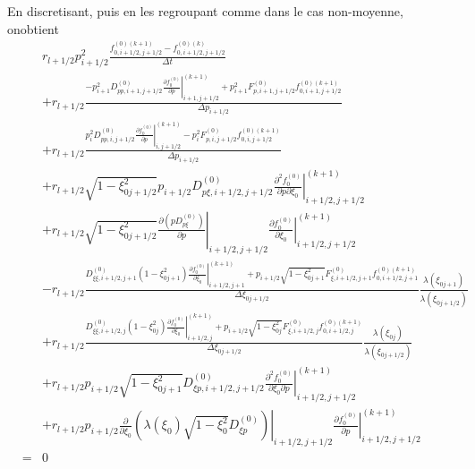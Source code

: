 En discretisant, puis en les regroupant comme dans le cas non-moyenne,
onobtient \begin{eqnarray*}
 &  & r_{l+1/2}p_{i+1/2}^{2}\frac{f_{0,i+1/2,j+1/2}^{\left(0\right)(k+1)}-f_{0,i+1/2,j+1/2}^{\left(0\right)(k)}}{\Delta t}\\
 &  & +r_{l+1/2}\frac{-p_{i+1}^{2}D_{pp,i+1,j+1/2}^{\left(0\right)}\left.\frac{\partial f_{0}^{\left(0\right)}}{\partial p}\right|_{i+1,j+1/2}^{(k+1)}+p_{i+1}^{2}F_{p,i+1,j+1/2}^{\left(0\right)}f_{0,i+1,j+1/2}^{\left(0\right)(k+1)}}{\Delta p_{i+1/2}}\\
 &  & +r_{l+1/2}\frac{p_{i}^{2}D_{pp,i,j+1/2}^{\left(0\right)}\left.\frac{\partial f_{0}^{\left(0\right)}}{\partial p}\right|_{i,j+1/2}^{(k+1)}-p_{i}^{2}F_{p,i,j+1/2}^{\left(0\right)}f_{0,i,j+1/2}^{\left(0\right)(k+1)}}{\Delta p_{i+1/2}}\\
 &  & +r_{l+1/2}\sqrt{1-\xi_{0j+1/2}^{2}}p_{i+1/2}D_{p\xi,i+1/2,j+1/2}^{\left(0\right)}\left.\frac{\partial^{2}f_{0}^{\left(0\right)}}{\partial p\partial\xi_{0}}\right|_{i+1/2,j+1/2}^{(k+1)}\\
 &  & +r_{l+1/2}\sqrt{1-\xi_{0j+1/2}^{2}}\left.\frac{\partial\left(pD_{p\xi}^{\left(0\right)}\right)}{\partial p}\right|_{i+1/2,j+1/2}\left.\frac{\partial f_{0}^{\left(0\right)}}{\partial\xi_{0}}\right|_{i+1/2,j+1/2}^{(k+1)}\\
 &  & -r_{l+1/2}\frac{D_{\xi\xi,i+1/2,j+1}^{\left(0\right)}\left(1-\xi_{0j+1}^{2}\right)\left.\frac{\partial f_{0}^{\left(0\right)}}{\partial\xi_{0}}\right|_{i+1/2,j+1}^{(k+1)}+p_{i+1/2}\sqrt{1-\xi_{0j+1}^{2}}F_{\xi,i+1/2,j+1}^{\left(0\right)}f_{0,i+1/2,j+1}^{\left(0\right)(k+1)}}{\Delta\xi_{0j+1/2}}\frac{\lambda\left(\xi_{0j+1}\right)}{\lambda\left(\xi_{0j+1/2}\right)}\\
 &  & +r_{l+1/2}\frac{D_{\xi\xi,i+1/2,j}^{\left(0\right)}\left(1-\xi_{0j}^{2}\right)\left.\frac{\partial f_{0}^{\left(0\right)}}{\partial\xi_{0}}\right|_{i+1/2,j}^{(k+1)}+p_{i+1/2}\sqrt{1-\xi_{0j}^{2}}F_{\xi,i+1/2,j}^{\left(0\right)}f_{0,i+1/2,j}^{\left(0\right)(k+1)}}{\Delta\xi_{0j+1/2}}\frac{\lambda\left(\xi_{0j}\right)}{\lambda\left(\xi_{0j+1/2}\right)}\\
 &  & +r_{l+1/2}p_{i+1/2}\sqrt{1-\xi_{0j+1}^{2}}D_{\xi p,i+1/2,j+1/2}^{\left(0\right)}\left.\frac{\partial^{2}f_{0}^{\left(0\right)}}{\partial\xi_{0}\partial p}\right|_{i+1/2,j+1/2}^{(k+1)}\\
 &  & +r_{l+1/2}p_{i+1/2}\left.\frac{\partial}{\partial\xi_{0}}\left(\lambda\left(\xi_{0}\right)\sqrt{1-\xi_{0}^{2}}D_{\xi p}^{\left(0\right)}\right)\right|_{i+1/2,j+1/2}\left.\frac{\partial f_{0}^{\left(0\right)}}{\partial p}\right|_{i+1/2,j+1/2}^{(k+1)}\\
 & = & 0\end{eqnarray*}
